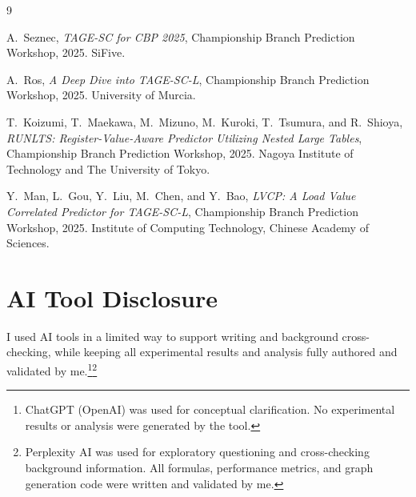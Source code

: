 \documentclass[11pt,a4paper]{article}
\begin{document}
\begin{thebibliography}{9}

A.~Seznec,
\textit{TAGE-SC for CBP 2025},
Championship Branch Prediction Workshop, 2025.
SiFive.

A.~Ros,
\textit{A Deep Dive into TAGE-SC-L},
Championship Branch Prediction Workshop, 2025.
University of Murcia.

T.~Koizumi, T.~Maekawa, M.~Mizuno, M.~Kuroki, T.~Tsumura, and R.~Shioya,
\textit{RUNLTS: Register-Value-Aware Predictor Utilizing Nested Large Tables},
Championship Branch Prediction Workshop, 2025.
Nagoya Institute of Technology and The University of Tokyo.

Y.~Man, L.~Gou, Y.~Liu, M.~Chen, and Y.~Bao,
\textit{LVCP: A Load Value Correlated Predictor for TAGE-SC-L},
Championship Branch Prediction Workshop, 2025.
Institute of Computing Technology, Chinese Academy of Sciences.
\end{thebibliography}

\section*{AI Tool Disclosure}
\noindent I used AI tools in a limited way to support writing and background cross-checking, while keeping all
experimental results and analysis fully authored and validated by me.\footnote{ChatGPT (OpenAI) was used for
conceptual clarification. No experimental results or analysis were generated by the tool.}\footnote{Perplexity AI
was used for exploratory questioning and cross-checking background information. All formulas, performance metrics,
and graph generation code were written and validated by me.}
\end{document}
